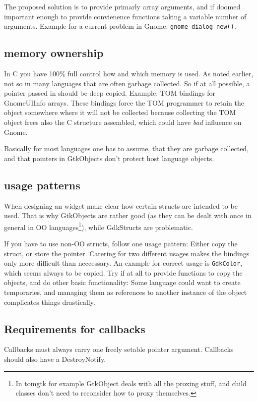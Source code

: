 \documentclass{article}
\begin{document}
The proposed solution is to provide primarly array arguments, and if
doomed important enough to provide convienence functions taking a
variable number of arguments. Example for a current problem in Gnome:
{\tt gnome\_dialog\_new()}.

\subsection{memory ownership}
In C you have 100\% full control how and which memory
    is used. As noted earlier, not so in many languages that are often
    garbage collected.
    So if at all possible, a pointer passed in should be deep copied.
    Example: TOM bindings for GnomeUIInfo arrays. These bindings force the
    TOM programmer to retain the object somewhere where it will not be
    collected because collecting the TOM object frees also the C structure
    assembled, which could have \emph{bad} influence on Gnome.

    Basically for most languages one has to assume, that they are
    garbage collected, and that pointers in GtkObjects don't protect
    host language objects. 

\subsection{usage patterns}
When designing an widget make clear how certain structs are intended
to be used. That is why GtkObjects are rather good (as they can be
dealt with once in general in OO languages\footnote{In tomgtk for
example GtkObject deals with all the proxing stuff, and child classes
don't need to reconsider how to proxy themselves.}), while GdkStructs are
problematic.

If you have to use non-OO structs, follow one usage pattern: Either
copy the struct, or store the pointer. Catering for two different
usages makes the bindings only more difficult than neccessary.
An example for correct usage is {\tt GdkColor}, which seems always to
be copied. Try if at all to provide functions to copy the objects, and
do other basic functionality: Some language could want to create
temporaries, and managing them as references to another instance of
the object complicates things drastically.

\subsection{Requirements for callbacks}
Callbacks must always carry one freely setable pointer
argument. Callbacks should also have a DestroyNotify.
\end{document}
